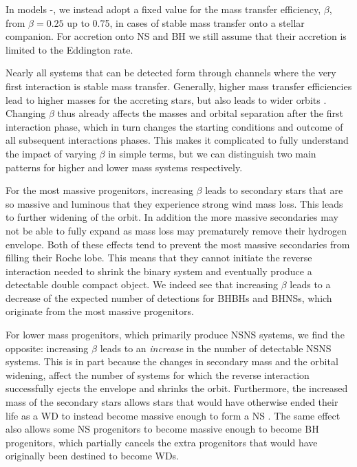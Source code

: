 In models \modBetaLow{}-\modBetaHigh{}, we instead adopt a fixed value for the mass transfer efficiency, $\beta$, from $\beta=0.25$ up to 0.75, in cases of stable mass transfer onto a stellar companion. For accretion onto NS and BH we still assume that their accretion is limited to the Eddington rate. 


Nearly all systems that can be detected form through channels where the very first interaction is stable mass transfer. Generally, higher mass transfer efficiencies lead to higher masses for the accreting stars, but also leads to wider orbits \citep{Soberman+1997, vanSon+2020}. Changing $\beta$ thus already affects the masses and orbital separation after the first interaction phase, which in turn changes the starting conditions and outcome of all subsequent interactions phases. This makes it complicated to fully understand the impact of varying $\beta$ in simple terms, but we can distinguish two main patterns for higher and lower mass systems respectively.   

For the most massive progenitors, increasing $\beta$ leads to secondary stars that are so massive and luminous that they experience strong wind mass loss. This leads to further widening of the orbit. In addition the more massive secondaries may not be able to fully expand as mass loss may prematurely remove their hydrogen envelope. Both of these effects tend to prevent the most massive secondaries from filling their Roche lobe. This means that they cannot initiate the reverse interaction needed to shrink the binary system and eventually produce a detectable double compact object. We indeed see that increasing $\beta$ leads to a decrease of the expected number of detections for BHBHs and BHNSs, which originate from the most massive progenitors.  

For lower mass progenitors, which primarily produce NSNS systems, we find the opposite: increasing $\beta$ leads to an \textit{increase} in the number of detectable NSNS systems. This is in part because  the changes in secondary mass and the orbital widening, affect the number of systems for which the reverse interaction successfully ejects the envelope and shrinks the orbit. Furthermore, the increased mass of the secondary stars allows stars that would have otherwise ended their life as a WD to instead become massive enough to form a NS \citep[e.g.][]{Zapartas+2017}. The same effect also allows some NS progenitors to become massive enough to become BH progenitors, which partially cancels the extra progenitors that would have originally been destined to become WDs.


